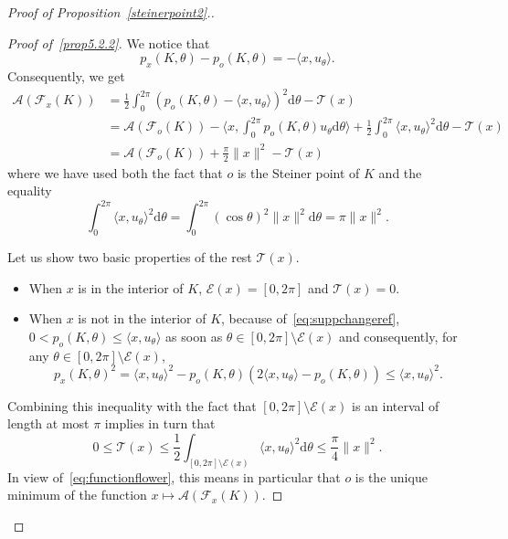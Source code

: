 \documentclass[10pt]{amsart}
\theoremstyle{definition}\newtheorem{defi}[theo]{Definition}\newtheorem{rema}[theo]{Remark}\newtheorem{exam}[theo]{Example}\newtheorem{exem}[theo]{Example}\newtheorem{nota}[theo]{Notation}
\newcommand{\cA}{\mathcal{A}}
\newcommand{\cE}{\mathcal{E}}
\newcommand{\cF}{\mathcal{F}}
\newcommand{\cT}{\mathcal{T}}
\newcommand{\dd}{\mathrm{d}}
\newcommand{\pass}{\vspace{0.3cm}\noindent}
\newcommand{\noi}{\noindent}
\newenvironment*{lastprooff}{\begin{proof}}{\end{proof}}
\begin{document}
\begin{proof}[{Proof of Proposition~\ref{steinerpoint2}.}]
\begin{lastprooff}[{Proof of~\eqref{prop5.2.2}}]
We notice that
\begin{equation}\label{eq:suppchangeref}
p_x(K,\theta) -p_o(K,\theta) = -\langle x, u_{\theta}\rangle.
\end{equation}
Consequently, we get
\begin{align}
\cA(\cF_x(K)) & =\frac1{2}\int_{0}^{2\pi} \left(p_o(K,\theta)-\langle x,u_{\theta}\rangle\right)^2\dd\theta-{\cT}(x)\nonumber\\
& =\cA(\cF_o(K))-\Big\langle x, \int_0^{2\pi} p_o(K,\theta)u_{\theta}\dd\theta\Big\rangle +\frac1{2}\int_0^{2\pi}\langle x,u_{\theta}\rangle^2\dd\theta-{\cT}(x)\nonumber\\
& =\cA(\cF_o(K))+\frac{\pi}{2}\|x\|^2-{\cT}(x)\label{eq:functionflower}
\end{align}
where we have used both the fact that $o$ is the Steiner point of $K$ and the equality
\begin{equation*}
\int_0^{2\pi}\langle x,u_{\theta}\rangle^2\dd\theta= \int_0^{2\pi}(\cos\theta)^2\|x\|^2\dd\theta =\pi \|x\|^2.
\end{equation*}

Let us show two basic properties of the rest ${\cT}(x)$.
\begin{itemize}
\item[-] When $x$ is in the interior of $K$, $\cE(x)=[0,2\pi]$ and ${\cT}(x)=0$.
\item[-] When $x$ is not in the interior of $K$, because of~\eqref{eq:suppchangeref}, $0<p_o(K,\theta)\le \langle x,u_\theta\rangle$ as soon as $\theta\in [0,2\pi]\setminus\cE(x)$ and consequently, for any $\theta\in [0,2\pi]\setminus\cE(x)$,
\begin{equation*}
p_x(K,\theta)^2=\langle x,u_\theta\rangle^2-p_o(K,\theta)(2\langle x,u_\theta\rangle-p_o(K,\theta))\le \langle x,u_\theta\rangle^2.
\end{equation*}
\end{itemize}

Combining this inequality with the fact that $[0,2\pi]\setminus \cE(x)$ is an interval of length at most $\pi$ implies in turn that
\begin{equation*}\label{eq:boundR(x)}
0\le {\cT}(x)\le \frac12\int_{[0,2\pi]\setminus\cE(x)} \langle x,u_\theta\rangle^2\dd\theta\le \frac{\pi}{4}\|x\|^2.
\end{equation*}
In view of~\eqref{eq:functionflower}, this means in particular that $o$ is the unique minimum of the function $x\longmapsto \cA(\cF_x(K))$.


\end{lastprooff}
\end{proof}
\end{document}
